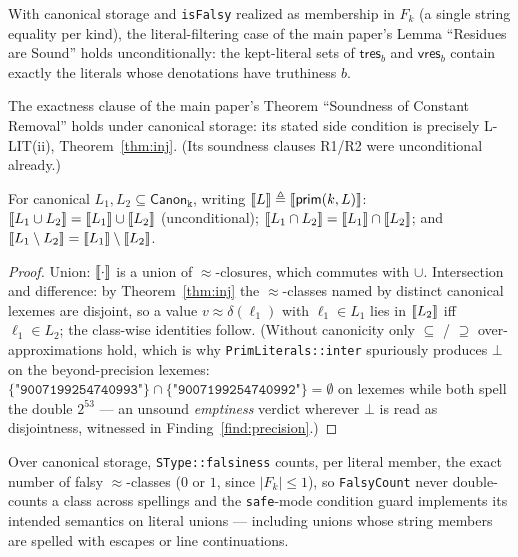 \documentclass[11pt]{article}
\newcommand{\Canon}[1]{\mathsf{Canon}_{\texttt{#1}}}
\begin{document}
\begin{corollary}
\label{cor:residue}
With canonical storage and \texttt{isFalsy} realized as membership in
$F_k$ (a single string equality per kind), the literal-filtering case of
the main paper's Lemma ``Residues are Sound'' holds unconditionally: the
kept-literal sets of $\mathsf{tres}_b$ and $\mathsf{vres}_b$ contain
exactly the literals whose denotations have truthiness $b$.
\end{corollary}

\begin{corollary}
\label{cor:rmc}
The exactness clause of the main paper's Theorem ``Soundness of Constant
Removal'' holds under canonical storage: its stated side condition is
precisely L-LIT(ii), Theorem~\ref{thm:inj}. (Its soundness clauses R1/R2
were unconditional already.)
\end{corollary}

\begin{corollary}
\label{cor:setops}
For canonical $L_1, L_2 \subseteq \Canon{k}$, writing
$\llbracket L \rrbracket \triangleq \llbracket \mathsf{prim}(k, L) \rrbracket$:
$\llbracket L_1 \cup L_2 \rrbracket = \llbracket L_1 \rrbracket \cup \llbracket L_2 \rrbracket$ (unconditional);
$\llbracket L_1 \cap L_2 \rrbracket = \llbracket L_1 \rrbracket \cap \llbracket L_2 \rrbracket$; and
$\llbracket L_1 \setminus L_2 \rrbracket = \llbracket L_1 \rrbracket \setminus \llbracket L_2 \rrbracket$.
\end{corollary}
\begin{proof}
Union: $\llbracket \cdot \rrbracket$ is a union of $\approx$-closures, which commutes
with $\cup$. Intersection and difference: by Theorem~\ref{thm:inj} the
$\approx$-classes named by distinct canonical lexemes are disjoint, so a
value $v \approx \delta(\ell_1) $ with $\ell_1 \in L_1$ lies in
$\llbracket L_2 \rrbracket$ iff $\ell_1 \in L_2$; the class-wise identities follow.
(Without canonicity only $\subseteq$ / $\supseteq$ over-approximations
hold, which is why \texttt{PrimLiterals::inter} spuriously produces
$\bot$ on the beyond-precision lexemes:
$\{\texttt{"9007199254740993"}\} \cap \{\texttt{"9007199254740992"}\}
= \emptyset$ on lexemes while both spell the double $2^{53}$ --- an
unsound \emph{emptiness} verdict wherever $\bot$ is read as disjointness,
witnessed in Finding~\ref{find:precision}.)
\end{proof}

\begin{corollary}
\label{cor:count}
Over canonical storage, \texttt{SType::falsiness} counts, per literal
member, the exact number of falsy $\approx$-classes ($0$ or $1$, since
$|F_k| \leq 1$), so \texttt{FalsyCount} never double-counts a class
across spellings and the \texttt{safe}-mode condition guard implements
its intended semantics on literal unions --- including unions whose
string members are spelled with escapes or line continuations.
\end{corollary}
\end{document}
